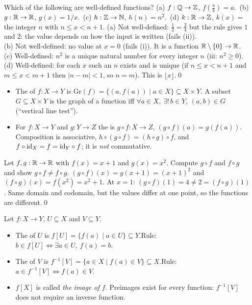\begin{hexample}
Which of the following are well-defined functions? (a) $f:\mathbb{Q}\to\mathbb{Z}$, $f(\frac ab)=a$.\ (b) $g:\mathbb{R}\to\mathbb{R}$, $g(x)=1/x$.\ (c) $h:\mathbb{Z}\to\mathbb{N}$, $h(n)=n^2$.\ (d) $k:\mathbb{R}\to\mathbb{Z}$, $k(x)=$ the integer $n$ with $n\le x<n+1$.
\solution
(a) Not well-defined: $\frac12=\frac24$ but the rule gives $1$ and $2$: the value depends on how the input is written (fails (ii)).\\
(b) Not well-defined: no value at $x=0$ (fails (i)). It is a function $\mathbb{R}\setminus\{0\}\to\mathbb{R}$.\\
(c) Well-defined: $n^2$ is a unique natural number for every integer $n$ (iii: $n^2\ge0$).\\
(d) Well-defined: for each $x$ such an $n$ exists and is unique (if $n\le x<n+1$ and $m\le x<m+1$ then $|n-m|<1$, so $n=m$). This is $\lfloor x\rfloor$.\qed
\end{hexample}

\begin{key}
\begin{itemize}
\item The  of $f:X\to Y$ is $\mathrm{Gr}(f)=\{(a,f(a))\mid a\in X\}\subseteq X\times Y$. A subset $G\subseteq X\times Y$ is the graph of a function iff $\forall a\in X,\ \exists!\,b\in Y,\ (a,b)\in G$ (``vertical line test'').
\item For $f:X\to Y$ and $g:Y\to Z$ the  is $g\circ f:X\to Z$, $(g\circ f)(a)=g(f(a))$. Composition is associative, $h\circ(g\circ f)=(h\circ g)\circ f$, and $f\circ\mathrm{id}_X=f=\mathrm{id}_Y\circ f$; it is \emph{not} commutative.
\end{itemize}
\end{key}

\begin{hexample}
Let $f,g:\mathbb{R}\to\mathbb{R}$ with $f(x)=x+1$ and $g(x)=x^2$. Compute $g\circ f$ and $f\circ g$ and show $g\circ f\neq f\circ g$.
\solution
$(g\circ f)(x)=g(x+1)=(x+1)^2$ and $(f\circ g)(x)=f(x^2)=x^2+1$. At $x=1$: $(g\circ f)(1)=4\neq2=(f\circ g)(1)$. Same domain and codomain, but the values differ at one point, so the functions are different.\qed
\end{hexample}

\begin{key}
Let $f:X\to Y$, $U\subseteq X$ and $V\subseteq Y$.
\begin{itemize}
\item The  of $U$ is $f[U]=\{f(a)\mid a\in U\}\subseteq Y$.\quad Rule: $b\in f[U]\Leftrightarrow\exists a\in U,\ f(a)=b$.
\item The  of $V$ is $f^{-1}[V]=\{a\in X\mid f(a)\in V\}\subseteq X$.\quad Rule: $a\in f^{-1}[V]\Leftrightarrow f(a)\in V$.
\item $f[X]$ is called \emph{the image of $f$}. Preimages exist for every function: $f^{-1}[V]$ does not require an inverse function.
\end{itemize}
\end{key}

